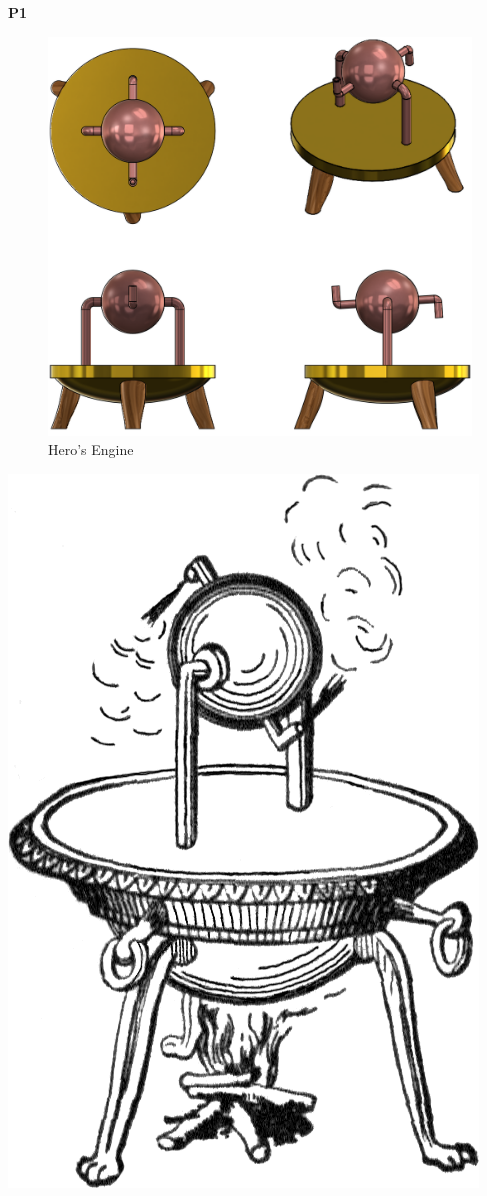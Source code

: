 \documentclass{article}
\begin{document}
{%
\textbf{P1}\\[0mm]
\begin{minipage}[c]{.8\textwidth}
\begin{figure}[H]
  \centering
  \includegraphics[width=.575\linewidth]{images/1.png}  
  \caption{Hero's Engine}
  \label{fig:1}
\end{figure}
\vspace{1mm}
\end{minipage}
\begin{minipage}[c]{.25\textwidth}
\includegraphics[width=.7\linewidth]{images/1b.png}
\end{minipage}
}
\end{document}
